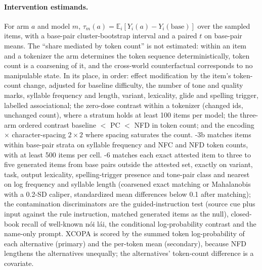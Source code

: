 \paragraph{Intervention estimands.}
For arm $a$ and model $m$, $\tau_m(a) = \mathbb{E}_i[Y_i(a) - Y_i(\mathrm{base})]$ over the sampled items, with a base-pair cluster-bootstrap interval and a paired $t$ on base-pair means. The ``share mediated by token count'' is not estimated: within an item and a tokenizer the arm determines the token sequence deterministically, token count is a coarsening of it, and the cross-world counterfactual corresponds to no manipulable state. In its place, in order: effect modification by the item's token-count change, adjusted for baseline difficulty, the number of tone and quality marks, syllable frequency and length, variant, lexicality, glide and spelling trigger, labelled associational; the zero-dose contrast within a tokenizer (changed ids, unchanged count), where a stratum holds at least 100 items per model; the three-arm ordered contrast baseline $<$ PC $<$ NFD in token count; and the encoding $\times$ character-spacing $2 \times 2$ where spacing saturates the count. \hyp{3b} matches items within base-pair strata on syllable frequency and NFC and NFD token counts, with at least 500 items per cell. \hyp{6} matches each exact attested item to three to five generated items from base pairs outside the attested set, exactly on variant, task, output lexicality, spelling-trigger presence and tone-pair class and nearest on log frequency and syllable length (coarsened exact matching or Mahalanobis with a 0.2-SD caliper, standardized mean differences below 0.1 after matching); the contamination discriminators are the guided-instruction test (source cue plus input against the rule instruction, matched generated items as the null), closed-book recall of well-known nói lái, the conditional log-probability contrast and the name-only prompt. XCOPA is scored by the summed token log-probability of each alternative (primary) and the per-token mean (secondary), because NFD lengthens the alternatives unequally; the alternatives' token-count difference is a covariate.

